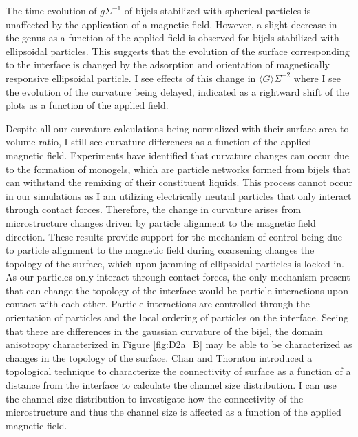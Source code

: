 The time evolution of $g \Sigma^{-1}$ of bijels stabilized with spherical particles is unaffected by the application of a magnetic field. However, a 
slight decrease in the genus as a function of the applied field is observed for bijels stabilized with ellipsoidal particles. This suggests that the 
evolution of the surface corresponding to the interface is changed by the adsorption and orientation of magnetically responsive ellipsoidal particle. 
I see effects of this change in $\langle G \rangle \Sigma^{-2}$ where I see the evolution of the curvature being delayed, indicated as a rightward 
shift of the plots as a function of the applied field. 

Despite all our curvature calculations being normalized with their surface area to volume ratio, I still see curvature differences as a function of the applied 
magnetic field. Experiments have identified that curvature changes can occur due to the formation of monogels, which are particle networks formed from bijels that 
can withstand the remixing of their constituent liquids. \cite{sanz_colloidal_2009, lee_making_2013} This process cannot occur in our simulations as I am utilizing 
electrically neutral particles that only interact through contact forces. Therefore, the change in curvature arises from microstructure changes driven by particle 
alignment to the magnetic field direction. These results provide support for the mechanism of control being due to particle alignment to the magnetic field during 
coarsening changes the topology of the surface, which upon jamming of ellipsoidal particles is locked in. As our particles only interact through contact forces, 
the only mechanism present that can change the topology of the interface would be particle interactions upon contact with each other. Particle interactions are 
controlled through the orientation of particles and the local ordering of particles on the interface. Seeing that there are differences in the gaussian curvature of the bijel,
the domain anisotropy characterized in Figure \ref{fig:D2a_B} may be able to be characterized as changes in the topology of the surface. Chan and Thornton introduced a 
topological technique to characterize the connectivity of surface as a function of a distance from the interface to calculate the channel size distribution. 
\cite{chan_channel_2012} I can use the channel size distribution to investigate how the connectivity of the microstructure and thus the 
channel size is affected as a function of the applied magnetic field.

